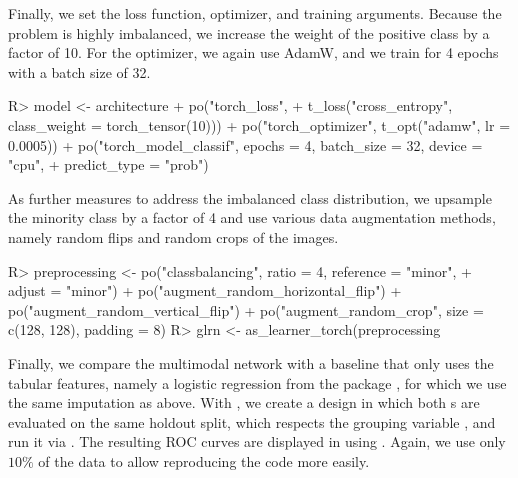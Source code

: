 \documentclass[article,shortnames]{jss}
\theoremstyle{definition}
\renewenvironment{CodeChunk}{\par\addvspace{0.6\baselineskip}\noindent\begin{minipage}{\linewidth}}{\end{minipage}\par\vspace{0.6\baselineskip}}
\begin{document}
\begin{CodeChunk}
\end{CodeChunk}

Finally, we set the loss function, optimizer, and training arguments.
Because the problem is highly imbalanced, we increase the weight of the positive class by a factor of 10.
For the optimizer, we again use AdamW, and we train for 4 epochs with a batch size of 32.

\begin{CodeChunk}
\begin{CodeInput}
R> model <- architecture %
+    po("torch_loss",
+      t_loss("cross_entropy", class_weight = torch_tensor(10))) %
+    po("torch_optimizer", t_opt("adamw", lr = 0.0005)) %
+    po("torch_model_classif", epochs = 4, batch_size = 32, device = "cpu",
+      predict_type = "prob")
\end{CodeInput}
\end{CodeChunk}

As further measures to address the imbalanced class distribution, we upsample the minority class by a factor of 4 and use various data augmentation methods, namely random flips and random crops of the images.

\begin{CodeChunk}
\begin{CodeInput}
R> preprocessing <- po("classbalancing", ratio = 4, reference = "minor",
+      adjust = "minor") %
+    po("augment_random_horizontal_flip") %
+    po("augment_random_vertical_flip") %
+    po("augment_random_crop", size = c(128, 128), padding = 8)
R> glrn <- as_learner_torch(preprocessing %
\end{CodeInput}
\end{CodeChunk}

Finally, we compare the multimodal network with a baseline that only uses the tabular features, namely a logistic regression from the  package \citep{ref-mlr3learners}, for which we use the same imputation as above.
With , we create a design in which both s are evaluated on the same holdout split, which respects the grouping variable , and run it via .
The resulting ROC curves are displayed in  using  \citep{ref-mlr3viz2025, ref-ggplot2}.
Again, we use only $10\%$ of the data to allow reproducing the code more easily.
\end{document}
